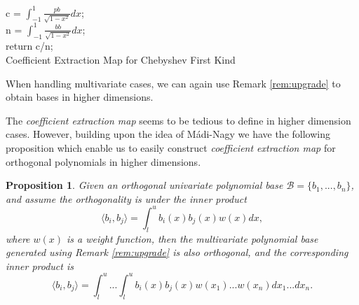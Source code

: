 \documentclass[12pt]{amsart}
\numberwithin{equation}{section}
\newtheorem{prop}[thm]{Proposition}
\theoremstyle{definition}
\numberwithin{thm}{section}
\begin{document}
\begin{algorithm}[H]
     \SetAlgoLined
     c = $\int_{-1}^1 \frac{pb}{\sqrt{1-x^2}} dx$;\\
     n = $\int_{-1}^1 \frac{bb}{\sqrt{1-x^2}} dx$;\\
     return c/n;\\
     \caption{Coefficient Extraction Map for Chebyshev First Kind}
\end{algorithm}

When handling multivariate cases, we can again use Remark \ref{rem:upgrade} to obtain bases in higher dimensions.

The \emph{coefficient extraction map} seems to be tedious to define in higher dimension cases.
However, building upon the idea of Mádi-Nagy we have the following proposition which enable us to easily 
construct \emph{coefficient extraction map} for orthogonal polynomials in higher dimensions. \cite{M-Nagy2012}

\begin{prop}
     \label{prop:COOLPROP}
     Given an orthogonal univariate polynomial base $\mathcal{B} = \{b_1, ..., b_n\}$, and assume the orthogonality is under the inner product 
     \begin{equation*}
          \langle b_i, b_j \rangle = \int_l^u b_i(x)b_j(x)w(x) dx,
     \end{equation*}
     where $w(x)$ is a weight function, 
     then the multivariate polynomial base generated using Remark \ref{rem:upgrade} is also orthogonal, and the corresponding inner product is
     \begin{equation*}
          \langle b_i, b_j \rangle = \int_l^u...\int_l^u  b_i(x)b_j(x)w(x_1)...w(x_n) dx_1 ... dx_n.
     \end{equation*}
\end{prop}
\end{document}
